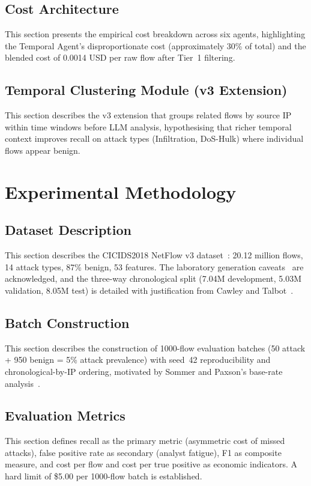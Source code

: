 \documentclass[12pt,openany,oneside,a4paper]{book}
\begin{document}
\section{Cost Architecture}
\label{sec:cost-architecture}
This section presents the empirical cost breakdown across six agents, highlighting the Temporal Agent's disproportionate cost (approximately 30\% of total) and the blended cost of 0.0014 USD per raw flow after Tier~1 filtering.

\section{Temporal Clustering Module (v3 Extension)}
\label{sec:temporal-clustering}
This section describes the v3 extension that groups related flows by source IP within time windows before LLM analysis, hypothesising that richer temporal context improves recall on attack types (Infiltration, DoS-Hulk) where individual flows appear benign.


\chapter{Experimental Methodology}
\label{ch:methodology}

\section{Dataset Description}
\label{sec:dataset-description}
This section describes the CICIDS2018 NetFlow v3 dataset~\autocite{Sharafaldin2018}: 20.12 million flows, 14 attack types, 87\% benign, 53 features. The laboratory generation caveats~\autocite{Kenyon2020, Ring2019} are acknowledged, and the three-way chronological split (7.04M development, 5.03M validation, 8.05M test) is detailed with justification from Cawley and Talbot~\autocite{Cawley2010}.

\section{Batch Construction}
\label{sec:batch-construction}
This section describes the construction of 1000-flow evaluation batches (50 attack + 950 benign = 5\% attack prevalence) with seed~42 reproducibility and chronological-by-IP ordering, motivated by Sommer and Paxson's base-rate analysis~\autocite{Sommer2010}.

\section{Evaluation Metrics}
\label{sec:evaluation-metrics}
This section defines recall as the primary metric (asymmetric cost of missed attacks), false positive rate as secondary (analyst fatigue), F1 as composite measure, and cost per flow and cost per true positive as economic indicators. A hard limit of \$5.00 per 1000-flow batch is established.
\end{document}
